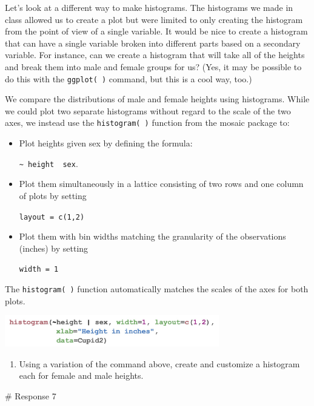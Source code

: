 \documentclass[
  letterpaper,
  DIV=11,
  numbers=noendperiod]{scrreprt}
\newenvironment{Shaded}{\begin{snugshade}}{\end{snugshade}}
\newcommand{\CommentTok}[1]{\textcolor[rgb]{0.37,0.37,0.37}{#1}}
\providecommand{\tightlist}{%
  \setlength{\itemsep}{0pt}\setlength{\parskip}{0pt}}\usepackage{longtable,booktabs,array}
\begin{document}
Let's look at a different way to make histograms. The histograms we made
in class allowed us to create a plot but were limited to only creating
the histogram from the point of view of a single variable. It would be
nice to create a histogram that can have a single variable broken into
different parts based on a secondary variable. For instance, can we
create a histogram that will take all of the heights and break them into
male and female groups for us? (Yes, it may be possible to do this with
the \texttt{ggplot(\ )} command, but this is a cool way, too.)

We compare the distributions of male and female heights using
histograms. While we could plot two separate histograms without regard
to the scale of the two axes, we instead use the \texttt{histogram(\ )}
function from the mosaic package to:

\begin{itemize}
\item
  Plot heights given sex by defining the formula:

  \texttt{\textasciitilde{}\ height\ \textbar{}\ sex}.
\item
  Plot them simultaneously in a lattice consisting of two rows and one
  column of plots by setting

  \texttt{layout\ =\ c(1,2)}
\item
  Plot them with bin widths matching the granularity of the observations
  (inches) by setting

  \texttt{width\ =\ 1}
\end{itemize}

The \texttt{histogram(\ )} function automatically matches the scales of
the axes for both plots.

\includegraphics[width=0.7\textwidth,height=\textheight]{./images/IL4_2.jpg}

\begin{enumerate}
\def\labelenumi{\arabic{enumi}.}
\setcounter{enumi}{6}
\tightlist
\item
  Using a variation of the command above, create and customize a
  histogram each for female and male heights.
\end{enumerate}

\begin{Shaded}
\begin{Highlighting}[]
\CommentTok{\# Response 7}
\end{Highlighting}
\end{Shaded}
\end{document}
